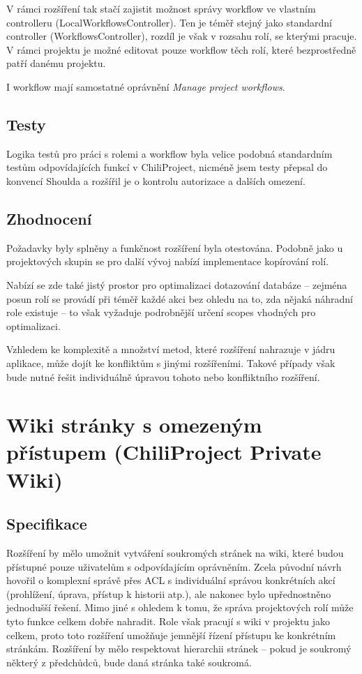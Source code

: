 \documentclass[thesis=B,czech]{FITthesis}[2012/05/02]
\begin{document}
V rámci rozšíření tak stačí zajistit možnost správy workflow ve vlastním
controlleru (LocalWorkflowsController). Ten je téměř stejný jako
standardní controller (WorkflowsController), rozdíl je však v rozsahu
rolí, se kterými pracuje. V rámci projektu je možné editovat pouze
workflow těch rolí, které bezprostředně patří danému projektu.

I workflow mají samostatné oprávnění \emph{Manage project workflows}.

\subsection{Testy}

Logika testů pro práci s rolemi a workflow byla velice podobná
standardním testům odpovídajících funkcí v ChiliProject, nicméně jsem
testy přepsal do konvencí Shoulda a rozšířil je o kontrolu autorizace a
dalších omezení.

\subsection{Zhodnocení}

Požadavky byly splněny a funkčnost rozšíření byla otestována. Podobně
jako u projektových skupin se pro další vývoj
nabízí implementace kopírování rolí.

Nabízí se zde také jistý prostor pro optimalizaci dotazování databáze -- zejména
posun rolí se provádí při téměř každé akci bez ohledu na to, zda nějaká
náhradní role existuje -- to však vyžaduje podrobnější určení
\glspl{scope} vhodných pro optimalizaci.

Vzhledem ke komplexitě a množství metod, které rozšíření nahrazuje
v jádru aplikace, může dojít ke konfliktům s jinými rozšířeními. Takové
případy však bude nutné řešit individuálně úpravou tohoto nebo
konfliktního rozšíření.

\section[Wiki stránky s omezeným přístupem]{Wiki stránky s omezeným přístupem (ChiliProject Private
Wiki)}
\label{sec:private_wiki}

\subsection{Specifikace}

Rozšíření by mělo umožnit vytváření soukromých stránek na \gls{wiki},
které budou přístupné pouze uživatelům s odpovídajícím oprávněním. Zcela
původní návrh hovořil o komplexní správě přes \gls{ACL} s individuální
správou konkrétních akcí (prohlížení, úprava, přístup k historii atp.),
ale nakonec bylo upřednostněno jednodušší řešení. Mimo jiné s ohledem k tomu, že
správa projektových rolí může tyto funkce celkem dobře nahradit. Role
však pracují s wiki v projektu jako celkem, proto toto rozšíření umožňuje
jemnější řízení přístupu ke konkrétním stránkám. Rozšíření by mělo
respektovat hierarchii stránek -- pokud je soukromý některý
z předchůdců, bude daná stránka také soukromá.
\end{document}
